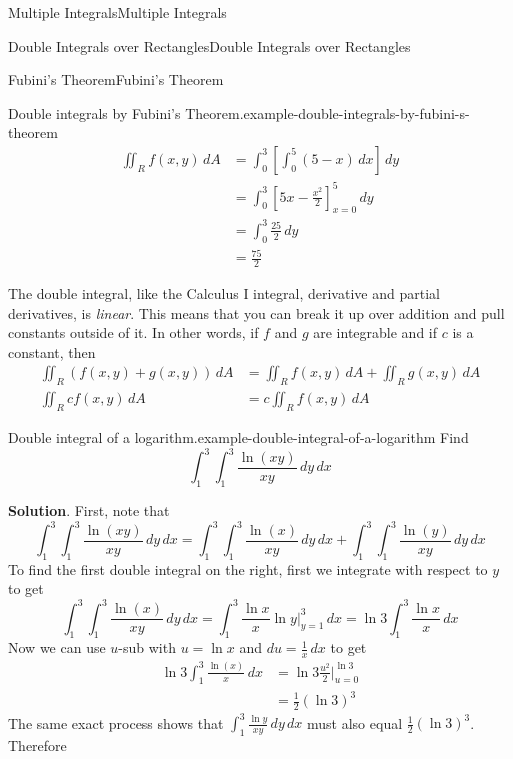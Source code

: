 \documentclass[10pt,]{book}
\numberwithin{equation}{section}
\begin{document}
\begin{chapterptx}{Multiple Integrals}{}{Multiple Integrals}{}{}
\begin{sectionptx}{Double Integrals over Rectangles}{}{Double Integrals over Rectangles}{}{}
\begin{subsectionptx}{Fubini's Theorem}{}{Fubini's Theorem}{}{}
\begin{example}{Double integrals by Fubini's Theorem.}{example-double-integrals-by-fubini-s-theorem}
\begin{align*}
\iint_{R}f(x,y)\,dA & = \int_{0}^{3}\left[\int_{0}^{5}(5-x)\,dx\right]\,dy \\
& = \int_{0}^{3}\left[5x - \frac{x^{2}}{2}\right]_{x=0}^{5}\,dy \\
& = \int_{0}^{3}\frac{25}{2}\,dy \\
& = \frac{75}{2} 
\end{align*}
%
\end{example}
\hypertarget{p-1250}{}%
The double integral, like the Calculus I integral, derivative and partial derivatives, is \emph{linear}. This means that you can break it up over addition and pull constants outside of it. In other words, if \(f\) and \(g\) are integrable and if \(c\) is a constant, then%
\begin{align*}
\iint_{R}(f(x,y) + g(x,y))\,dA & = \iint_{R}f(x,y)\,dA + \iint_{R}g(x,y)\,dA \\
\iint_{R}cf(x,y)\,dA & = c\iint_{R}f(x,y)\,dA 
\end{align*}
%
\begin{example}{Double integral of a logarithm.}{example-double-integral-of-a-logarithm}%
\hypertarget{p-1251}{}%
Find%
\begin{equation*}
\int_{1}^{3}\int_{1}^{3}\frac{\ln(xy)}{xy}\,dy\,dx
\end{equation*}
%
\par\smallskip%
\noindent\textbf{Solution}.\hypertarget{solution-198}{}\quad%
First, note that%
\begin{equation*}
\int_{1}^{3}\int_{1}^{3}\frac{\ln(xy)}{xy}\,dy\,dx = \int_{1}^{3}\int_{1}^{3}\frac{\ln(x)}{xy}\,dy\,dx + \int_{1}^{3}\int_{1}^{3}\frac{\ln(y)}{xy}\,dy\,dx
\end{equation*}
To find the first double integral on the right, first we integrate with respect to \(y\) to get%
\begin{equation*}
\int_{1}^{3}\int_{1}^{3}\frac{\ln(x)}{xy}\,dy\,dx = \int_{1}^{3}\frac{\ln x}{x}\ln y\big|_{y=1}^{3}\,dx = \ln 3\int_{1}^{3}\frac{\ln x}{x}\,dx
\end{equation*}
Now we can use \(u\)-sub with \(u = \ln x\) and \(du = \frac{1}{x}\,dx\) to get%
\begin{align*}
\ln3\int_{1}^{3}\frac{\ln(x)}{x}\,dx & = \ln3 \frac{u^{2}}{2}\big|_{u=0}^{\ln 3} \\
& = \frac{1}{2}(\ln3)^{3} 
\end{align*}
The same exact process shows that \(\int_{1}^{3}\frac{\ln y}{xy}\,dy\,dx\) must also equal \(\frac{1}{2}(\ln3)^{3}\). Therefore%

\end{example}
\end{subsectionptx}
\end{sectionptx}
\end{chapterptx}
\end{document}
